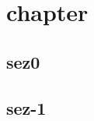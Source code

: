 
\chapter{chapter}
\label{chp:----}

\section{sez0}
\label{sec:0}

\lipsum[1-5]


\section{sez-1}
\label{sec:1}

\lipsum[6-12]